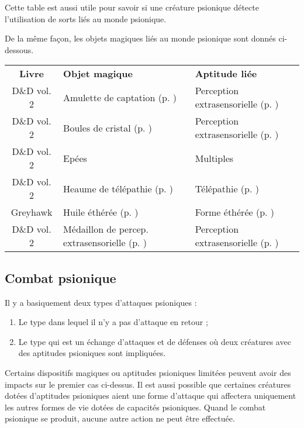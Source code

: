 Cette table est aussi utile pour savoir si une créature psionique détecte l'utilisation de sorts liés au monde psionique.

\bigskip

De la même façon, les objets magiques liés au monde psionique sont donnés ci-dessous.

\bigskip
\begin{tabular}{cll}
\textbf{Livre}  & \textbf{Objet magique}    & \textbf{Aptitude liée} \\
D\&D vol. 2     & Amulette de captation (p. \pageref{objet-amulette-captation}) & Perception extrasensorielle (p. \pageref{magicien-ESP}) \\
D\&D vol. 2     & Boules de cristal (p. \pageref{objet-boule-cristal}) & Perception extrasensorielle (p. \pageref{magicien-ESP}) \\
D\&D vol. 2     & Epées                     & Multiples \\
D\&D vol. 2     & Heaume de télépathie (p. \pageref{objet-heaume-telepathie})   & Télépathie (p. \pageref{objet-heaume-telepathie})  \\
Greyhawk        & Huile éthérée (p. \pageref{objet-huile-etheree}) & Forme éthérée (p. \pageref{magicien-forme-etheree}) \\
D\&D vol. 2     & Médaillon de percep. extrasensorielle (p. \pageref{objet-medaillon-esp}) & Perception extrasensorielle (p. \pageref{magicien-ESP}) \\
\end{tabular}


\subsection*{Combat psionique}

Il y a basiquement deux types d'attaques psioniques :

\bigskip

\begin{enumerate}
\item Le type dans lequel il n'y a pas d'attaque en retour ;
\item Le type qui est un échange d'attaques et de défenses où deux créatures avec des aptitudes psioniques sont impliquées.
\end{enumerate}

\bigskip

Certains dispositifs magiques ou aptitudes psioniques limitées peuvent avoir des impacts sur le premier cas ci-dessus. Il est aussi possible que certaines créatures dotées d'aptitudes psioniques aient une forme d'attaque qui affectera uniquement les autres formes de vie dotées de capacités psioniques. Quand le combat psionique se produit, aucune autre action ne peut être effectuée.

